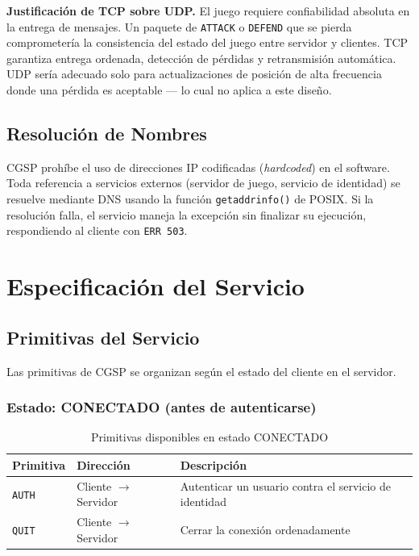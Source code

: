 \documentclass[12pt, letterpaper]{article}
\begin{document}
\begin{nota}
\textbf{Justificación de TCP sobre UDP.} El juego requiere confiabilidad absoluta en
la entrega de mensajes. Un paquete de \texttt{ATTACK} o \texttt{DEFEND} que se
pierda comprometería la consistencia del estado del juego entre servidor y clientes.
TCP garantiza entrega ordenada, detección de pérdidas y retransmisión automática.
UDP sería adecuado solo para actualizaciones de posición de alta frecuencia donde
una pérdida es aceptable --- lo cual no aplica a este diseño.
\end{nota}

\subsection{Resolución de Nombres}

CGSP prohíbe el uso de direcciones IP codificadas (\textit{hardcoded}) en el
software. Toda referencia a servicios externos (servidor de juego, servicio de
identidad) se resuelve mediante DNS usando la función \texttt{getaddrinfo()} de
POSIX. Si la resolución falla, el servicio maneja la excepción sin finalizar su
ejecución, respondiendo al cliente con \texttt{ERR 503}.

\section{Especificación del Servicio}

\subsection{Primitivas del Servicio}

Las primitivas de CGSP se organizan según el estado del cliente en el servidor.

\subsubsection{Estado: CONECTADO (antes de autenticarse)}

\begin{table}[H]
\centering
\begin{tabularx}{\textwidth}{l l X}
\toprule
\textbf{Primitiva} & \textbf{Dirección} & \textbf{Descripción} \\
\midrule
\texttt{AUTH} & Cliente $\rightarrow$ Servidor & Autenticar un usuario contra el servicio de identidad \\
\texttt{QUIT} & Cliente $\rightarrow$ Servidor & Cerrar la conexión ordenadamente \\
\bottomrule
\end{tabularx}
\caption{Primitivas disponibles en estado CONECTADO}
\end{table}
\end{document}
